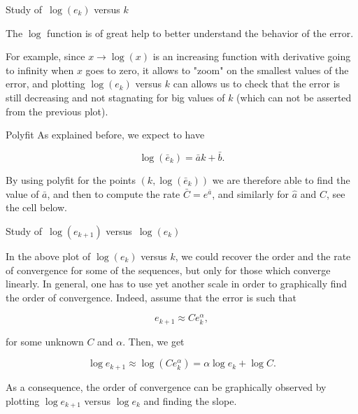 \documentclass{article}
\begin{document}
        \vspace{10pt}

        \begin{other}{Study of $\,\log(e_k)$ versus $k$}

            The $\log$ function is of great help to better understand the behavior of the error.
            \vspace{4pt}

            \noindent
            For example, since $x\to\log(x)$ is an increasing function with derivative going to infinity when $x$ goes to zero, it allows to "zoom" on the smallest values of the error, and plotting $\log(e_k)$ versus $k$ can allows us to check that the error is still decreasing and not stagnating for big values of $k$ (which can not be asserted from the previous plot).
        \end{other}

        \vspace{4pt}

        \begin{other}{Polyfit}
        As explained before, we expect to have 

        $$
        \log (\bar e_k) = \bar ak + \bar b.
        $$
        
        By using polyfit for the points $(k,\log (\bar e_k))$ we are therefore able to find the value of $\bar a$, and then to compute the rate $\bar C = e^{\bar a}$, and similarly for $\hat a$ and $\hat C$, see the cell below.
        \end{other}

        \vspace{4pt}

        \begin{other}{Study of $\,\log(e_{k+1})$ versus $\,\log(e_k)$}

            In the above plot of $\log(e_k)$ versus $k$, we could recover the order and the rate of convergence for some of the sequences, but only for those which converge linearly. In general, one has to use yet another scale in order to graphically find the order of convergence. Indeed, assume that the error is such that
            
            $$
            e_{k+1} \approx C e_k^\alpha,
            $$
            
            for some unknown $C$ and $\alpha$. Then, we get 
            
            $$
            \log e_{k+1} \approx \log \left(C e_k^\alpha\right) = \alpha \log e_k +  \log C.
            $$
            
            As a consequence, the order of convergence can be graphically observed by plotting $\log e_{k+1}$ versus $\log e_k$ and finding the slope.
        \end{other}
\end{document}
